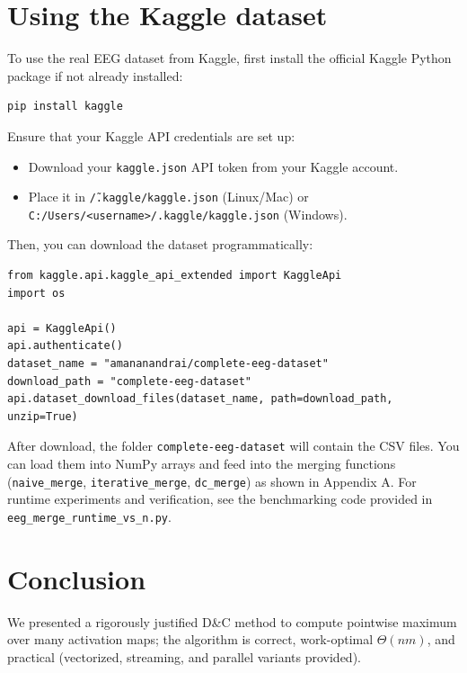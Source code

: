 \documentclass[11pt]{article}
\begin{document}
\section{Using the Kaggle dataset}
To use the real EEG dataset from Kaggle, first install the official Kaggle Python package if not already installed:
\begin{verbatim}
pip install kaggle
\end{verbatim}
Ensure that your Kaggle API credentials are set up:
\begin{itemize}
  \item Download your \texttt{kaggle.json} API token from your Kaggle account.
  \item Place it in \texttt{\~/.kaggle/kaggle.json} (Linux/Mac) or
        \texttt{C:/Users/<username>/.kaggle/kaggle.json}
(Windows).
\end{itemize}

Then, you can download the dataset programmatically:

\begin{verbatim}
from kaggle.api.kaggle_api_extended import KaggleApi
import os

api = KaggleApi()
api.authenticate()
dataset_name = "amananandrai/complete-eeg-dataset"
download_path = "complete-eeg-dataset"
api.dataset_download_files(dataset_name, path=download_path, unzip=True)
\end{verbatim}

After download, the folder \texttt{complete-eeg-dataset} will contain the CSV files. You can load them into NumPy arrays and feed into the merging functions (\texttt{naive\_merge}, \texttt{iterative\_merge}, \texttt{dc\_merge}) as shown in Appendix A. For runtime experiments and verification, see the benchmarking code provided in \texttt{eeg\_merge\_runtime\_vs\_n.py}.


\section{Conclusion}
We presented a rigorously justified D\&C method to compute pointwise maximum over many activation maps; the algorithm is correct, work-optimal \(\Theta(nm)\), and practical (vectorized, streaming, and parallel variants provided).

\appendix
\end{document}

